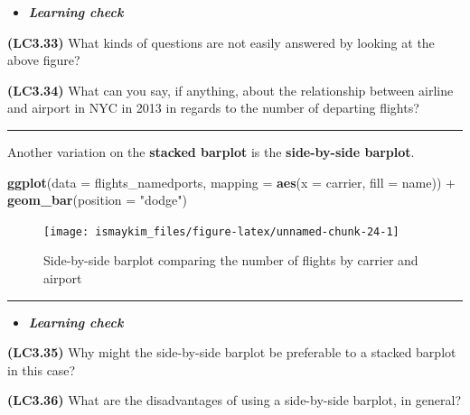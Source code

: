 \documentclass[]{tufte-book}
\newenvironment{Shaded}{\begin{snugshade}}{\end{snugshade}}
\newcommand{\KeywordTok}[1]{\textcolor[rgb]{0.13,0.29,0.53}{\textbf{{#1}}}}
\newcommand{\DataTypeTok}[1]{\textcolor[rgb]{0.13,0.29,0.53}{{#1}}}
\newcommand{\StringTok}[1]{\textcolor[rgb]{0.31,0.60,0.02}{{#1}}}
\newcommand{\NormalTok}[1]{{#1}}
\let\oldrule=\rule
\renewcommand{\rule}[1]{\oldrule{\linewidth}}
\newenvironment{rmdblock}[1]
  {\begin{shaded*}
  \begin{itemize}
  \renewcommand{\labelitemi}{
    \raisebox{-.7\height}[0pt][0pt]{
    }
  }
  \item
  }
  {
  \end{itemize}
  \end{shaded*}
  }
\newenvironment{learncheck}
  {\begin{rmdblock}{warning}}
  {\end{rmdblock}}
\begin{document}
\begin{learncheck}
\textbf{\emph{Learning check}}
\end{learncheck}

\textbf{(LC3.33)} What kinds of questions are not easily answered by
looking at the above figure?

\textbf{(LC3.34)} What can you say, if anything, about the relationship
between airline and airport in NYC in 2013 in regards to the number of
departing flights?

\begin{center}\rule{0.5\linewidth}{\linethickness}\end{center}

Another variation on the \textbf{stacked barplot} is the
\textbf{side-by-side barplot}.

\begin{Shaded}
\begin{Highlighting}[]
\KeywordTok{ggplot}\NormalTok{(}\DataTypeTok{data =} \NormalTok{flights_namedports, }\DataTypeTok{mapping =} \KeywordTok{aes}\NormalTok{(}\DataTypeTok{x =} \NormalTok{carrier, }\DataTypeTok{fill =} \NormalTok{name)) +}
\StringTok{  }\KeywordTok{geom_bar}\NormalTok{(}\DataTypeTok{position =} \StringTok{"dodge"}\NormalTok{)}
\end{Highlighting}
\end{Shaded}

\begin{figure}

{\centering \texttt{[image: ismaykim\_files/figure-latex/unnamed-chunk-24-1]} 

}

\caption[Side-by-side barplot comparing the number of flights by carrier and airport]{Side-by-side barplot comparing the number of flights by carrier and airport}\label{fig:unnamed-chunk-24}
\end{figure}

\begin{center}\rule{0.5\linewidth}{\linethickness}\end{center}

\begin{learncheck}
\textbf{\emph{Learning check}}
\end{learncheck}

\textbf{(LC3.35)} Why might the side-by-side barplot be preferable to a
stacked barplot in this case?

\textbf{(LC3.36)} What are the disadvantages of using a side-by-side
barplot, in general?
\end{document}
